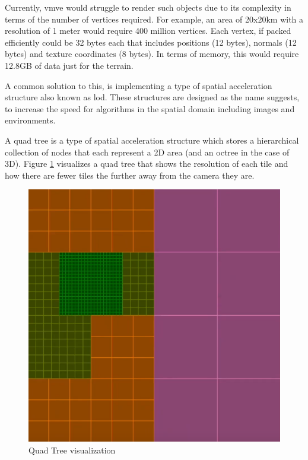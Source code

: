 \documentclass[11pt]{article}
\begin{document}
Currently, \gls{vmve} would struggle to render such objects due to its
complexity in terms of the number of vertices required. For example, an area of
20x20km with a resolution of 1 meter would require 400 million vertices. Each
vertex, if packed efficiently could be 32 bytes each that includes positions (12
bytes), normals (12 bytes) and texture coordinates (8 bytes). In terms of
memory, this would require 12.8GB of data just for the terrain.

A common solution to this, is implementing a type of spatial acceleration
structure also known as \gls{lod}. These structures are designed as the name
suggests, to increase the speed for algorithms in the spatial domain including
images and environments.

A quad tree is a type of spatial acceleration structure which stores a
hierarchical collection of nodes that each represent a 2D area (and an octree in
the case of 3D). Figure \ref{fig:quad_tree} visualizes a quad tree that shows
the resolution of each tile and how there are fewer tiles the further away from
the camera they are.

\begin{figure}[h!]
  \centering
  \includegraphics[width=\textwidth]{images/quad_tree.png}
  \caption{Quad Tree visualization}
  \label{fig:quad_tree}
\end{figure}
\end{document}
